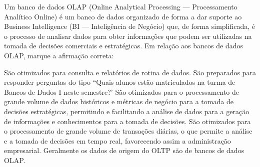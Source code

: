 \documentclass[12pt, addpoints]{exam}
\begin{document}
\begin{questions}
\question
Um banco de dados OLAP (Online Analytical Processing --- Processamento Analítico
Online) é um banco de dados organizado de forma a dar suporte ao Business
Intelligence (BI --- Inteligência de Negócio) que, de forma simplificada, é o
processo de analisar dados para obter informações que podem ser utilizadas na
tomada de decisões comerciais e estratégicas. Em relação aos bancos de dados
OLAP, marque a afirmação correta:
\begin{choices}
\choice São otimizados para consulta e relatórios de rotina de dados.
\choice São preparados para responder perguntas do tipo ``Quais alunos estão matriculados na turma de Bancos de Dados I neste semestre?'
\choice São otimizados para o processamento de grande volume de dados históricos e métricas de negócio para a tomada de decisões estratégicas, permitindo e facilitando a análise de dados para a geração de informações e conhecimentos para a tomada de decisões.
\choice São otimizados para o processamento de grande volume de transações diárias, o que permite a análise e a tomada de decisões em tempo real, favorecendo assim a administração empresarial.
\choice Geralmente os dados de origem do OLTP são de bancos de dados OLAP.
\end{choices}



    \end{questions}
    
\end{document}
